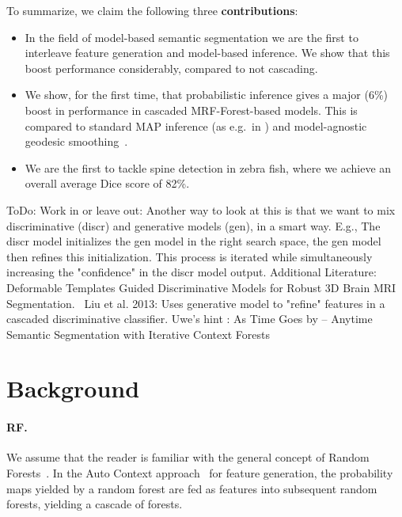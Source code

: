 \documentclass[10pt,twocolumn,letterpaper]{article}
\begin{document}
To summarize, we claim the following three {\bf contributions}:
\begin{itemize}
\item In the field of model-based semantic segmentation we are the first to interleave feature generation and model-based inference. We show that this boost performance considerably, compared to not cascading. 
\item We show, for the first time, that probabilistic inference gives a major (6\%) boost in performance in cascaded MRF-Forest-based models. This is compared to standard MAP inference (as e.g.\ in \cite{Glocker2013,SeifertAnatomicalSPIE2009,TeethMICCAI2012}) and model-agnostic geodesic smoothing~\cite{GeoForests2013}. 
\item We are the first to tackle spine detection in zebra fish, where we achieve an overall average Dice score of 82\%.
\end{itemize}



ToDo: Work in or leave out:
%
Another way to look at this is that we want to mix discriminative (discr) and generative models (gen), in a smart way.  E.g., The discr model initializes the gen model in the right search space, the gen model then refines this initialization.  This process is iterated while simultaneously increasing the "confidence" in the discr model output. 
%
Additional Literature: 
%
Deformable Templates Guided Discriminative Models for Robust 3D Brain MRI Segmentation.~\cite{BrainSeg2013}  Liu et al.  2013: Uses generative model to "refine" features in a cascaded discriminative classifier.
%
Uwe's hint \cite{Denzler2012}: As Time Goes by -- Anytime Semantic Segmentation with Iterative Context Forests


\section{Background}

\paragraph{RF. }
We assume that the reader is familiar with the general concept of Random Forests~\cite{BreimanRF}. 
%
In the Auto Context approach~\cite{AutoContext2008} for feature generation, the probability maps yielded by a random forest are fed as features into subsequent random forests, yielding a cascade of forests.  
%
\end{document}
